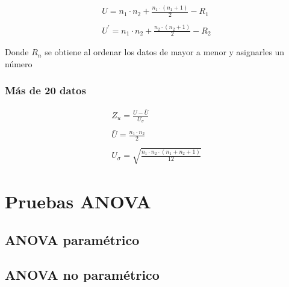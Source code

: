 \documentclass{AsignaturaResumen}
\begin{document}
\begin{gather*}
    U = n_{1} \cdot n_{2} + \frac{n_{1} \cdot (n_{1} + 1)}{2} - R_{1}
    \\\\
    U^{\prime} = n_{1} \cdot n_{2} + \frac{n_{2} \cdot (n_{2} + 1)}{2} - R_{2}
\end{gather*}

Donde $R_{n}$ se obtiene al ordenar los datos de mayor a menor y asignarles un número

\subsubsection{Más de 20 datos}

\begin{gather*}
    Z_{u} = \frac{U - \bar{U}}{U_\sigma}
    \\\\
    \bar{U} = \frac{n_{1} \cdot n_{2}}{2}
    \\\\
    U_{\sigma} = \sqrt{\frac{n_{1} \cdot n_{2} \cdot (n_{1} + n_{2} + 1)}{12}}
\end{gather*}



\section{Pruebas ANOVA}

\subsection{ANOVA paramétrico}



\subsection{ANOVA no paramétrico}



\ifx\ISMAIN\undefined
    
\end{document}
